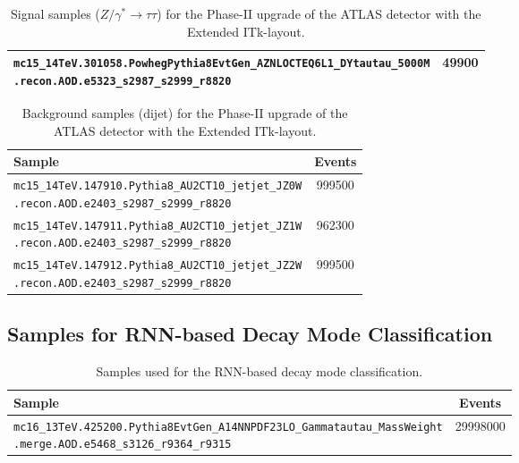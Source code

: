 \begin{table}[htbp]
{\begin{tabular}{p{13cm}S[table-format=6.0]}
    \texttt{mc15\_14TeV.301058.PowhegPythia8EvtGen\_AZNLOCTEQ6L1\_DYtautau\_5000M\newline\hspace*{1em}.recon.AOD.e5323\_s2987\_s2999\_r8820} & 49900 \\
    \bottomrule
  \end{tabular}
  }
  \caption[Signal samples for the Phase-II upgrade of the ATLAS detector]{Signal
    samples ($Z / \gamma^* \to \tau\tau$) for the Phase-II upgrade of the ATLAS
    detector with the Extended ITk-layout.}
  \label{tab:samples_upgrade_tau}
\end{table}

\begin{table}[htbp]
  \centering
  {\small
  \begin{tabular}{p{13cm}S[table-format=6.0]}
    \toprule
    Sample & {Events} \\
    \midrule
    \texttt{mc15\_14TeV.147910.Pythia8\_AU2CT10\_jetjet\_JZ0W\newline\hspace*{1em}.recon.AOD.e2403\_s2987\_s2999\_r8820} & 999500 \\
    \texttt{mc15\_14TeV.147911.Pythia8\_AU2CT10\_jetjet\_JZ1W\newline\hspace*{1em}.recon.AOD.e2403\_s2987\_s2999\_r8820} & 962300 \\
    \texttt{mc15\_14TeV.147912.Pythia8\_AU2CT10\_jetjet\_JZ2W\newline\hspace*{1em}.recon.AOD.e2403\_s2987\_s2999\_r8820} & 999500 \\
    \bottomrule
  \end{tabular}
  }
  \caption[Background samples for the Phase-II upgrade of the ATLAS
  detector]{Background samples (dijet) for the Phase-II upgrade of the ATLAS
    detector with the Extended ITk-layout.}
  \label{tab:samples_upgrade_dijet}
\end{table}


\FloatBarrier
\subsection{Samples for RNN-based Decay Mode Classification}
\label{app:mc16a_taus}

\begin{table}[htbp]
  \centering
  {\small
  \begin{tabular}{p{13cm}S[table-format=8.0]}
    \toprule
    Sample & {Events} \\
    \midrule
    \texttt{mc16\_13TeV.425200.Pythia8EvtGen\_A14NNPDF23LO\_Gammatautau\_MassWeight\newline\hspace*{1em}.merge.AOD.e5468\_s3126\_r9364\_r9315} & 29998000 \\
    \bottomrule
  \end{tabular}
  }
  \caption[Samples used for the RNN-based decay mode classification]{Samples
    used for the RNN-based decay mode classification.}
  \label{tab:samples_mc16a_taus}
\end{table}

